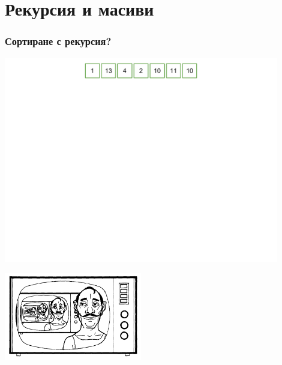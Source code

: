 \documentclass{beamer}
\begin{document}
%


\section{Рекурсия и масиви}


\begin{frame}[fragile]
\frametitle{Сортиране с рекурсия?}

\begin{center}
   \includegraphics[width=12cm]{images/array_unsorted}

   \vspace{-210px}
   \includegraphics[width=6cm]{images/rec_wirt}
\end{center}

\end{frame}
\end{document}
